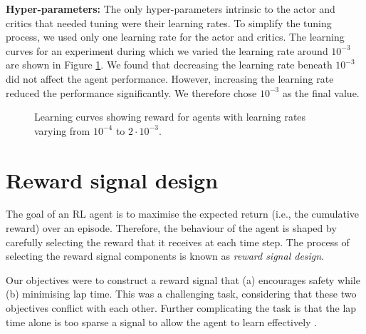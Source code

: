 \textbf{Hyper-parameters:}
The only hyper-parameters intrinsic to the actor and critics that needed tuning were their learning rates.
To simplify the tuning process, we used only one learning rate for the actor and critics.
The learning curves for an experiment during which we varied the learning rate around $10^{-3}$ are shown in Figure \ref{fig:alpha_learning_curve}.
We found that decreasing the learning rate beneath $10^{-3}$ did not affect the agent performance.
However, increasing the learning rate reduced the performance significantly.
We therefore chose $10^{-3}$ as the final value.
\begin{figure}[htb!]
    \centering
    
    \caption[Learning curves showing reward for agents with varying learning rates]{Learning curves showing reward for agents with learning rates varying from $10^{-4}$ to $2\cdot10^{-3}$.}
    \label{fig:alpha_learning_curve}
\end{figure}
% 



\section{Reward signal design}
The goal of an RL agent is to maximise the expected return (i.e., the cumulative reward) over an episode.
Therefore, the behaviour of the agent is shaped by carefully selecting the reward that it receives at each time step.
The process of selecting the reward signal components is known as \emph{reward signal design}.

Our objectives were to construct a reward signal that (a) encourages safety while (b) minimising lap time.
This was a challenging task, considering that these two objectives conflict with each other.
Further complicating the task is that the lap time alone is too sparse a signal to allow the agent to learn effectively \cite{Perot2017, Jaritz2018}.


